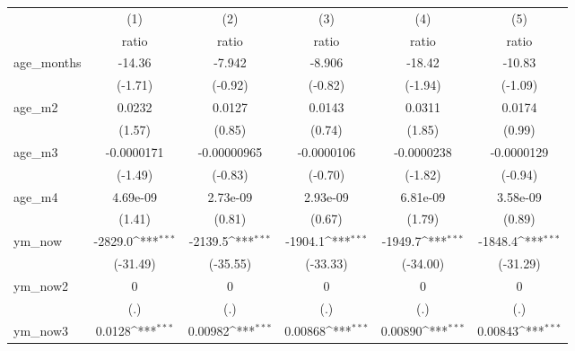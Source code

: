 {
\def\sym#1{\ifmmode^{#1}\else\(^{#1}\)\fi}
\begin{tabular}{l*{5}{c}}
\hline\hline
                    &\multicolumn{1}{c}{(1)}&\multicolumn{1}{c}{(2)}&\multicolumn{1}{c}{(3)}&\multicolumn{1}{c}{(4)}&\multicolumn{1}{c}{(5)}\\
                    &\multicolumn{1}{c}{ratio}&\multicolumn{1}{c}{ratio}&\multicolumn{1}{c}{ratio}&\multicolumn{1}{c}{ratio}&\multicolumn{1}{c}{ratio}\\
\hline
age\_months          &      -14.36         &      -7.942         &      -8.906         &      -18.42         &      -10.83         \\
                    &     (-1.71)         &     (-0.92)         &     (-0.82)         &     (-1.94)         &     (-1.09)         \\
age\_m2              &      0.0232         &      0.0127         &      0.0143         &      0.0311         &      0.0174         \\
                    &      (1.57)         &      (0.85)         &      (0.74)         &      (1.85)         &      (0.99)         \\
age\_m3              &  -0.0000171         & -0.00000965         &  -0.0000106         &  -0.0000238         &  -0.0000129         \\
                    &     (-1.49)         &     (-0.83)         &     (-0.70)         &     (-1.82)         &     (-0.94)         \\
age\_m4              &    4.69e-09         &    2.73e-09         &    2.93e-09         &    6.81e-09         &    3.58e-09         \\
                    &      (1.41)         &      (0.81)         &      (0.67)         &      (1.79)         &      (0.89)         \\
ym\_now              &     -2829.0\sym{***}&     -2139.5\sym{***}&     -1904.1\sym{***}&     -1949.7\sym{***}&     -1848.4\sym{***}\\
                    &    (-31.49)         &    (-35.55)         &    (-33.33)         &    (-34.00)         &    (-31.29)         \\
ym\_now2             &           0         &           0         &           0         &           0         &           0         \\
                    &         (.)         &         (.)         &         (.)         &         (.)         &         (.)         \\
ym\_now3             &      0.0128\sym{***}&     0.00982\sym{***}&     0.00868\sym{***}&     0.00890\sym{***}&     0.00843\sym{***}\\

\end{tabular}}
